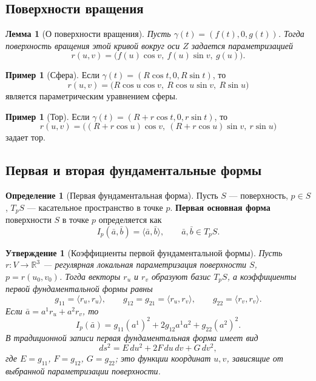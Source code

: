 \documentclass[12pt,a4paper]{article}
\newtheorem{lemma}[theorem]{Лемма}
\newtheorem{proposition}[theorem]{Утверждение}
\theoremstyle{definition}
\newtheorem{definition}[theorem]{Определение}
\newtheorem{example}[theorem]{Пример}
\begin{document}
\subsection{Поверхности вращения}

\begin{lemma}[О поверхности вращения]
Пусть $\gamma(t) = (f(t), 0, g(t))$. Тогда поверхность вращения этой кривой вокруг оси $Z$ задается параметризацией
$$r(u, v) = \big(f(u)\cos v,\ f(u)\sin v,\ g(u)\big).$$
\end{lemma}

\begin{example}[Сфера]
Если $\gamma(t) = (R \cos t, 0, R \sin t)$, то
$$r(u, v) = \big(R \cos u \cos v,\ R \cos u \sin v,\ R \sin u\big)$$
является параметрическим уравнением сферы.
\end{example}

\begin{example}[Тор]
Если $\gamma(t) = (R + r\cos t, 0, r\sin t)$, то
$$r(u, v) = \big((R + r\cos u)\cos v,\ (R + r\cos u)\sin v,\ r\sin u\big)$$
задает тор.
\end{example}

\subsection{Первая и вторая фундаментальные формы}

\begin{definition}[Первая фундаментальная форма]
Пусть $S$ --- поверхность, $p \in S$, $T_pS$ --- касательное пространство в точке $p$. \textbf{Первая основная форма} поверхности $S$ в точке $p$ определяется как
$$I_p(\bar{a}, \bar{b}) = \langle \bar{a}, \bar{b} \rangle, \qquad \bar{a}, \bar{b} \in T_pS.$$
\end{definition}

\begin{proposition}[Коэффициенты первой фундаментальной формы]
Пусть $r: V \to \mathbb{R}^3$ --- регулярная локальная параметризация поверхности $S$, $p = r(u_0, v_0)$. Тогда векторы $r_u$ и $r_v$ образуют базис $T_pS$, а коэффициенты первой фундаментальной формы равны
$$g_{11} = \langle r_u, r_u \rangle,\qquad g_{12} = g_{21} = \langle r_u, r_v \rangle,\qquad g_{22} = \langle r_v, r_v \rangle.$$
Если $\bar{a} = a^1 r_u + a^2 r_v$, то
$$I_p(\bar{a}) = g_{11}(a^1)^2 + 2g_{12}a^1a^2 + g_{22}(a^2)^2.$$
\textit{В традиционной записи первая фундаментальная форма имеет вид}
$$ds^2 = E\,du^2 + 2F\,du\,dv + G\,dv^2,$$
\textit{где $E = g_{11}$, $F = g_{12}$, $G = g_{22}$; это функции координат $u,v$, зависящие от выбранной параметризации поверхности.}
\end{proposition}
\end{document}
